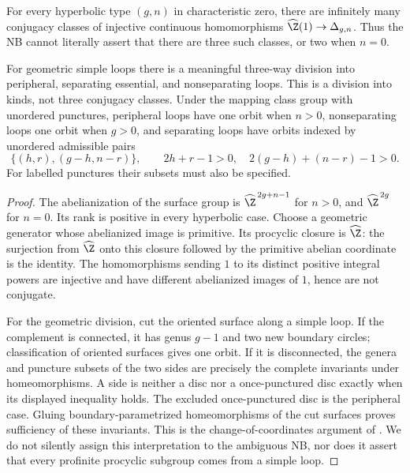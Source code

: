 \begin{proposition}\label{A6-three-classes}
For every hyperbolic type $(g,n)$ in characteristic zero, there are infinitely many conjugacy classes of injective continuous homomorphisms $\widehat{\Z}(1)\to\Delta_{g,n}$. Thus the NB cannot literally assert that there are three such classes, or two when $n=0$.

For geometric simple loops there is a meaningful three-way division into peripheral, separating essential, and nonseparating loops. This is a division into kinds, not three conjugacy classes. Under the mapping class group with unordered punctures, peripheral loops have one orbit when $n>0$, nonseparating loops one orbit when $g>0$, and separating loops have orbits indexed by unordered admissible pairs
\[
 \{(h,r),(g-h,n-r)\},\qquad
 2h+r-1>0,\quad 2(g-h)+(n-r)-1>0.
\]
For labelled punctures their subsets must also be specified.
\end{proposition}
\begin{proof}
The abelianization of the surface group is $\widehat{\Z}^{\,2g+n-1}$ for $n>0$, and $\widehat{\Z}^{\,2g}$ for $n=0$. Its rank is positive in every hyperbolic case. Choose a geometric generator whose abelianized image is primitive. Its procyclic closure is $\widehat{\Z}$: the surjection from $\widehat{\Z}$ onto this closure followed by the primitive abelian coordinate is the identity. The homomorphisms sending $1$ to its distinct positive integral powers are injective and have different abelianized images of $1$, hence are not conjugate.

For the geometric division, cut the oriented surface along a simple loop. If the complement is connected, it has genus $g-1$ and two new boundary circles; classification of oriented surfaces gives one orbit. If it is disconnected, the genera and puncture subsets of the two sides are precisely the complete invariants under homeomorphisms. A side is neither a disc nor a once-punctured disc exactly when its displayed inequality holds. The excluded once-punctured disc is the peripheral case. Gluing boundary-parametrized homeomorphisms of the cut surfaces proves sufficiency of these invariants. This is the change-of-coordinates argument of \cite[\S1.3]{FarbMargalit2012A567}. We do not silently assign this interpretation to the ambiguous NB, nor does it assert that every profinite procyclic subgroup comes from a simple loop.
\end{proof}

